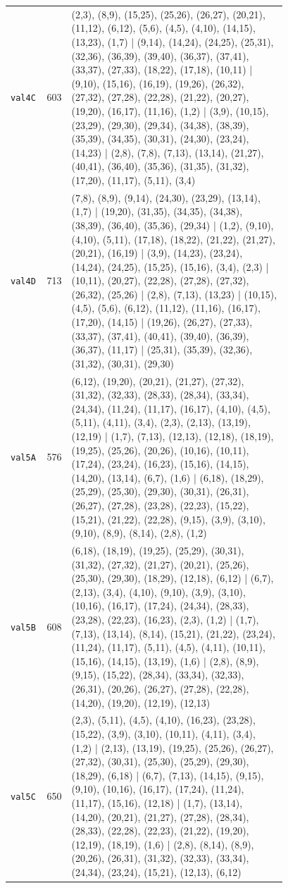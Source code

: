 \begin{landscape}
\begin{longtable}{lr>{\tiny\raggedright\arraybackslash}p{0.78\linewidth}}
\texttt{val4C} & 603 & (2,3), (8,9), (15,25), (25,26), (26,27), (20,21), (11,12), (6,12), (5,6), (4,5), (4,10), (14,15), (13,23), (1,7) | (9,14), (14,24), (24,25), (25,31), (32,36), (36,39), (39,40), (36,37), (37,41), (33,37), (27,33), (18,22), (17,18), (10,11) | (9,10), (15,16), (16,19), (19,26), (26,32), (27,32), (27,28), (22,28), (21,22), (20,27), (19,20), (16,17), (11,16), (1,2) | (3,9), (10,15), (23,29), (29,30), (29,34), (34,38), (38,39), (35,39), (34,35), (30,31), (24,30), (23,24), (14,23) | (2,8), (7,8), (7,13), (13,14), (21,27), (40,41), (36,40), (35,36), (31,35), (31,32), (17,20), (11,17), (5,11), (3,4) \\[2pt]
\texttt{val4D} & 713 & (7,8), (8,9), (9,14), (24,30), (23,29), (13,14), (1,7) | (19,20), (31,35), (34,35), (34,38), (38,39), (36,40), (35,36), (29,34) | (1,2), (9,10), (4,10), (5,11), (17,18), (18,22), (21,22), (21,27), (20,21), (16,19) | (3,9), (14,23), (23,24), (14,24), (24,25), (15,25), (15,16), (3,4), (2,3) | (10,11), (20,27), (22,28), (27,28), (27,32), (26,32), (25,26) | (2,8), (7,13), (13,23) | (10,15), (4,5), (5,6), (6,12), (11,12), (11,16), (16,17), (17,20), (14,15) | (19,26), (26,27), (27,33), (33,37), (37,41), (40,41), (39,40), (36,39), (36,37), (11,17) | (25,31), (35,39), (32,36), (31,32), (30,31), (29,30) \\[2pt]
\texttt{val5A} & 576 & (6,12), (19,20), (20,21), (21,27), (27,32), (31,32), (32,33), (28,33), (28,34), (33,34), (24,34), (11,24), (11,17), (16,17), (4,10), (4,5), (5,11), (4,11), (3,4), (2,3), (2,13), (13,19), (12,19) | (1,7), (7,13), (12,13), (12,18), (18,19), (19,25), (25,26), (20,26), (10,16), (10,11), (17,24), (23,24), (16,23), (15,16), (14,15), (14,20), (13,14), (6,7), (1,6) | (6,18), (18,29), (25,29), (25,30), (29,30), (30,31), (26,31), (26,27), (27,28), (23,28), (22,23), (15,22), (15,21), (21,22), (22,28), (9,15), (3,9), (3,10), (9,10), (8,9), (8,14), (2,8), (1,2) \\[2pt]
\texttt{val5B} & 608 & (6,18), (18,19), (19,25), (25,29), (30,31), (31,32), (27,32), (21,27), (20,21), (25,26), (25,30), (29,30), (18,29), (12,18), (6,12) | (6,7), (2,13), (3,4), (4,10), (9,10), (3,9), (3,10), (10,16), (16,17), (17,24), (24,34), (28,33), (23,28), (22,23), (16,23), (2,3), (1,2) | (1,7), (7,13), (13,14), (8,14), (15,21), (21,22), (23,24), (11,24), (11,17), (5,11), (4,5), (4,11), (10,11), (15,16), (14,15), (13,19), (1,6) | (2,8), (8,9), (9,15), (15,22), (28,34), (33,34), (32,33), (26,31), (20,26), (26,27), (27,28), (22,28), (14,20), (19,20), (12,19), (12,13) \\[2pt]
\texttt{val5C} & 650 & (2,3), (5,11), (4,5), (4,10), (16,23), (23,28), (15,22), (3,9), (3,10), (10,11), (4,11), (3,4), (1,2) | (2,13), (13,19), (19,25), (25,26), (26,27), (27,32), (30,31), (25,30), (25,29), (29,30), (18,29), (6,18) | (6,7), (7,13), (14,15), (9,15), (9,10), (10,16), (16,17), (17,24), (11,24), (11,17), (15,16), (12,18) | (1,7), (13,14), (14,20), (20,21), (21,27), (27,28), (28,34), (28,33), (22,28), (22,23), (21,22), (19,20), (12,19), (18,19), (1,6) | (2,8), (8,14), (8,9), (20,26), (26,31), (31,32), (32,33), (33,34), (24,34), (23,24), (15,21), (12,13), (6,12) \\[2pt]

\end{longtable}
\end{landscape}
